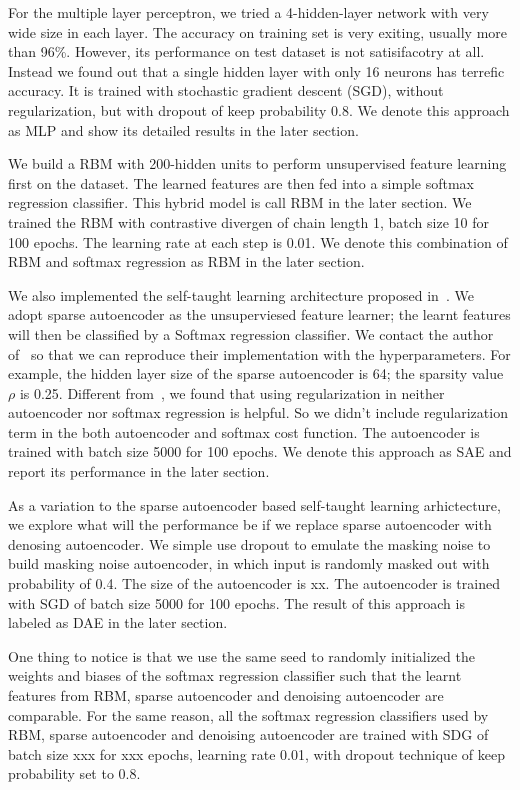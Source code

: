 For the multiple layer perceptron, we tried a 4-hidden-layer network with very wide size
in each layer.
The accuracy on training set is very exiting, usually more than 96\%.
However, its performance on test dataset is not satisifacotry at all.
Instead we found out that a single hidden layer with only 16 neurons has terrefic accuracy.
It is trained with stochastic gradient descent (SGD), without regularization, but with dropout of keep
probability 0.8.
We denote this approach as MLP and show its detailed results in the later section.

We build a RBM with 200-hidden units to perform unsupervised feature learning first on the dataset.
The learned features are then fed into a simple softmax regression classifier.
This hybrid model is call RBM in the later section.
We trained the RBM with contrastive divergen of chain length 1, batch size 10 for 100 epochs.
The learning rate at each step is 0.01.
We denote this combination of RBM and softmax regression as RBM in the later section.

We also implemented the self-taught learning architecture proposed in~\cite{STL-NIDS, SparseAE}.
We adopt sparse autoencoder as the unsuperviesed feature learner;
the learnt features will then be classified by a Softmax regression classifier.
We contact the author of~\cite{STL-NIDS} so that we can reproduce their implementation
with the hyperparameters.
For example, the hidden layer size of the sparse autoencoder is 64; the sparsity value $\rho$ is 0.25.
Different from~\cite{STL-NIDS}, we found that using regularization in
neither autoencoder nor softmax regression is helpful.
So we didn't include regularization term in the both autoencoder and softmax cost function.
The autoencoder is trained with batch size 5000 for 100 epochs.
We denote this approach as SAE and report its performance in the later section.

As a variation to the sparse autoencoder based self-taught learning arhictecture,
we explore what will the performance be if we replace sparse autoencoder with denosing autoencoder.
We simple use dropout to emulate the masking noise to build masking noise autoencoder,
in which input is randomly masked out with probability of 0.4.
The size of the autoencoder is xx.
The autoencoder is trained with SGD of batch size 5000 for 100 epochs.
The result of this approach is labeled as DAE in the later section.

One thing to notice is that we use the same seed to randomly initialized the weights and biases
of the softmax regression classifier such that the learnt features from RBM, sparse autoencoder and
denoising autoencoder are comparable.
For the same reason, all the softmax regression classifiers used by RBM, sparse autoencoder and
denoising autoencoder are trained with SDG of batch size xxx for xxx epochs, learning rate 0.01,
with dropout technique of keep probability set to 0.8.

